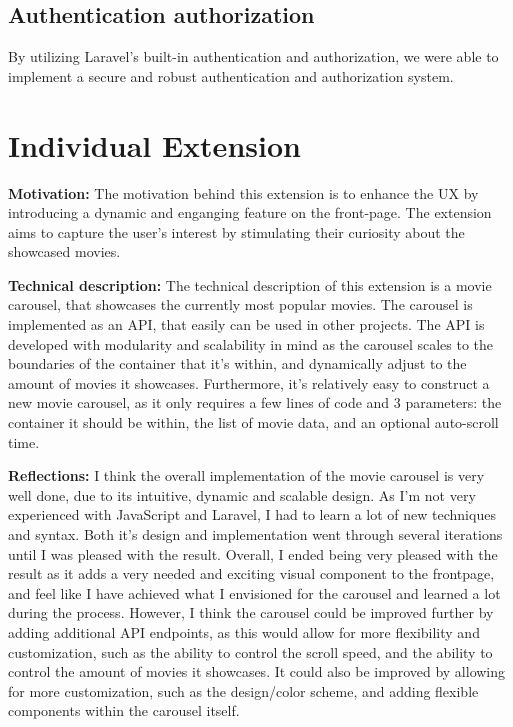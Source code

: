 \documentclass[letterpaper,twocolumn]{article}
\begin{document}
\subsection{Authentication authorization} %
By utilizing Laravel's built-in authentication and authorization, we were able to implement a secure and robust authentication and authorization system.

\section{Individual Extension}
\textbf{Motivation:} %
The motivation behind this extension is to enhance the UX by introducing a dynamic and enganging feature on the front-page. The extension aims to capture the user's interest by stimulating their curiosity about the showcased movies.

\textbf{Technical description:} %
The technical description of this extension is a movie carousel, that showcases the currently most popular movies. 
The carousel is implemented as an API, that easily can be used in other projects. 
The API is developed with modularity and scalability in mind as the carousel scales to the boundaries of the container that it's within, and dynamically adjust to the amount of movies it showcases. 
Furthermore, it's relatively easy to construct a new movie carousel, as it only requires a few lines of code and 3 parameters: the container it should be within, the list of movie data, and an optional auto-scroll time.

\textbf{Reflections:} %
I think the overall implementation of the movie carousel is very well done, due to its intuitive, dynamic and scalable design. 
As I'm not very experienced with JavaScript and Laravel, I had to learn a lot of new techniques and syntax. 
Both it's design and implementation went through several iterations until I was pleased with the result. 
Overall, I ended being very pleased with the result as it adds a very needed and exciting visual component to the frontpage, and feel like I have achieved what I envisioned for the carousel and learned a lot during the process.
However, I think the carousel could be improved further by adding additional API endpoints, as this would allow for more flexibility and customization, such as the ability to control the scroll speed, and the ability to control the amount of movies it showcases. 
It could also be improved by allowing for more customization, such as the design/color scheme, and adding flexible components within the carousel itself.
\end{document}
